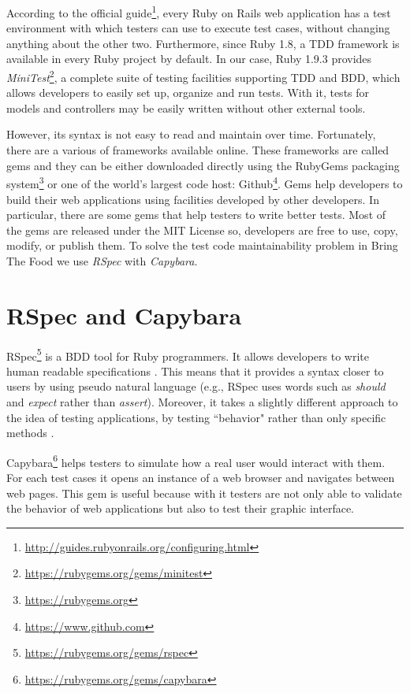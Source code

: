 According to the official guide\footnote{\url{http://guides.rubyonrails.org/configuring.html}}, every Ruby on Rails web application has a test environment with which testers can use to execute test cases, without changing anything about the other two. Furthermore, since Ruby 1.8, a TDD framework is available in every Ruby project by default. In our case, Ruby 1.9.3 provides \textit{MiniTest}\footnote{\url{https://rubygems.org/gems/minitest}}, a complete suite of testing facilities supporting TDD and BDD, which allows developers to easily set up, organize and run tests. With it, tests for models and controllers may be easily written without other external tools.

However, its syntax is not easy to read and maintain over time. Fortunately, there are a various of frameworks available online. These frameworks are called gems and they can be either downloaded directly using the RubyGems packaging system\footnote{\url{https://rubygems.org}} or one of the world's largest code host: Github\footnote{\url{https://www.github.com}}. Gems help developers to build their web applications using facilities developed by other developers. In particular, there are some gems that help testers to write better tests. Most of the gems are released under the MIT License so, developers are free to use, copy, modify, or publish them. To solve the test code maintainability problem in Bring The Food we use \textit{RSpec} with \textit{Capybara}.

\section{RSpec and Capybara}

RSpec\footnote{\url{https://rubygems.org/gems/rspec}} is a BDD tool for Ruby programmers. It allows developers to write human readable specifications \cite{book:rspec}. This means that it provides a syntax closer to users by using pseudo natural language (e.g., RSpec uses words such as \textit{should} and \textit{expect} rather than \textit{assert}). Moreover, it takes a slightly different approach to the idea of testing applications, by testing ``behavior" rather than only specific methods \cite{intro_rspec}.

Capybara\footnote{\url{https://rubygems.org/gems/capybara}} helps testers to simulate how a real user would interact with them. For each test cases it opens an instance of a web browser and navigates between web pages. This gem is useful because with it testers are not only able to validate the behavior of web applications but also to test their graphic interface.

